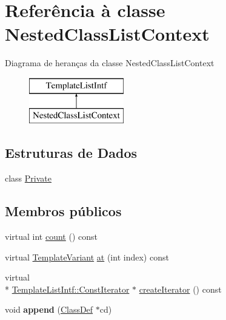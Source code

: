 \hypertarget{class_nested_class_list_context}{\section{Referência à classe Nested\-Class\-List\-Context}
\label{class_nested_class_list_context}
}
Diagrama de heranças da classe Nested\-Class\-List\-Context\begin{figure}[H]
\begin{center}
\leavevmode
\includegraphics[height=2.000000cm]{class_nested_class_list_context}
\end{center}
\end{figure}
\subsection*{Estruturas de Dados}
\begin{DoxyCompactItemize}
\item 
class \hyperlink{class_nested_class_list_context_1_1_private}{Private}
\end{DoxyCompactItemize}
\subsection*{Membros públicos}
\begin{DoxyCompactItemize}
\item 
virtual int \hyperlink{class_nested_class_list_context_a0745638c9967e2ed90bc96c012288c55}{count} () const 
\item 
virtual \hyperlink{class_template_variant}{Template\-Variant} \hyperlink{class_nested_class_list_context_a55f90d50fcb1378b2a97b9c3ad5bb162}{at} (int index) const 
\item 
virtual \\*
\hyperlink{class_template_list_intf_1_1_const_iterator}{Template\-List\-Intf\-::\-Const\-Iterator} $\ast$ \hyperlink{class_nested_class_list_context_a0b1d6dedc3f51750e5cba18f51022f10}{create\-Iterator} () const 
\item 
\hypertarget{class_nested_class_list_context_afd9611d84cd0245aaab51a55afbf235e}{void {\bfseries append} (\hyperlink{class_class_def}{Class\-Def} $\ast$cd)}\label{class_nested_class_list_context_afd9611d84cd0245aaab51a55afbf235e}

\end{DoxyCompactItemize}


